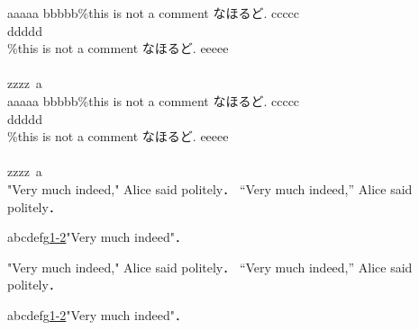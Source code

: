 aaaaa%
bbbbb\%this is not a comment なほるど.
ccccc\\%
ddddd\\\%this is not a comment なほるど.
eeeee\\\\%
zzzz\ a \\%

aaaaa%
bbbbb\%this is not a comment なほるど. \cite{..}
ccccc\\%
ddddd\\\%this is not a comment なほるど. \cite{..}
eeeee\\\\%
zzzz\ a \\%

"Very much indeed," Alice said politely． %
``Very much indeed,'' Alice said politely． %

abcdefg\url{1-2}"Very much indeed"．%

"Very much indeed," Alice said politely． %
``Very much indeed,'' Alice said politely． %

abcdefg\url{1-2}"Very much indeed"．%
